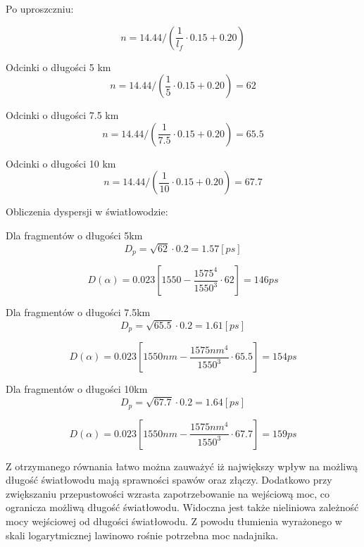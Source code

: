 \documentclass[paper=a4, fontsize=11pt]{scrartcl} %
\numberwithin{equation}{section} %
\numberwithin{figure}{section} %
\numberwithin{table}{section} %
\begin{document}
Po uproszczniu:

\begin{equation} 
  n = 14.44 / (\frac{1}{l_f} \cdot 0.15 + 0.20)
\end{equation}

Odcinki o długości 5 km
\begin{equation} 
  n = 14.44 / (\frac{1}{5} \cdot 0.15 + 0.20) = 62
\end{equation}

Odcinki o długości 7.5 km
\begin{equation} 
  n = 14.44 / (\frac{1}{7.5} \cdot 0.15 + 0.20) = 65.5
\end{equation}

Odcinki o długości 10 km
\begin{equation} 
  n = 14.44 / (\frac{1}{10} \cdot 0.15 + 0.20) =  67.7 
\end{equation}

Obliczenia dyspersji w światłowodzie:

Dla fragmentów o długości 5km
\begin{equation} 
  D_p = \sqrt{62} \cdot 0.2 =  1.57 [ps]
\end{equation}

\begin{equation}
  D(\alpha)=0.023[1550-\frac{1575^4}{1550^3} \cdot 62] = 146 ps 
\end{equation}

Dla fragmentów o długości 7.5km
\begin{equation} 
  D_p = \sqrt{65.5} \cdot 0.2 =  1.61 [ps]
\end{equation}

\begin{equation}
  D(\alpha)=0.023[1550nm-\frac{1575nm^4}{1550^3} \cdot 65.5] = 154 ps 
\end{equation}

Dla fragmentów o długości 10km
\begin{equation} 
  D_p = \sqrt{67.7} \cdot 0.2 =  1.64 [ps]
\end{equation}

\begin{equation}
  D(\alpha)=0.023[1550nm-\frac{1575nm^4}{1550^3} \cdot 67.7] = 159 ps 
\end{equation}

Z otrzymanego równania łatwo można zauważyć iż największy wpływ na możliwą długość światłowodu mają sprawności spawów oraz złączy.
Dodatkowo przy zwiększaniu przepustowości wzrasta zapotrzebowanie na wejściową moc, co ogranicza możliwą długość światłowodu.
Widoczna jest także nieliniowa zależność mocy wejściowej od długości światłowodu. Z powodu tłumienia wyrażonego w skali logarytmicznej
lawinowo rośnie potrzebna moc nadajnika.
\end{document}
